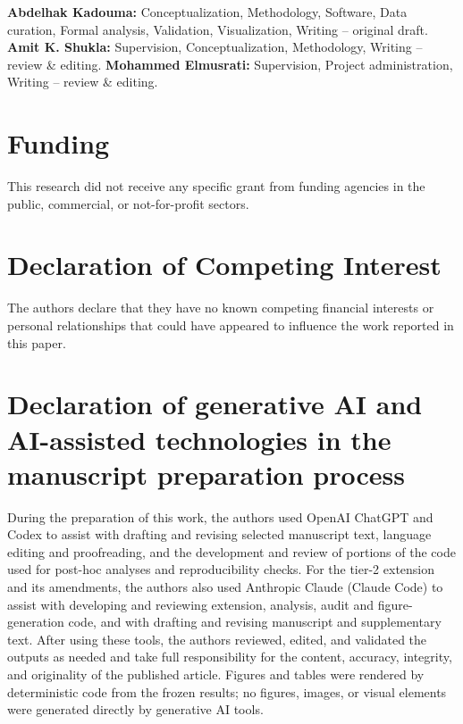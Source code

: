 \documentclass[5p,twocolumn]{elsarticle}
\begin{document}
\textbf{Abdelhak Kadouma:} Conceptualization, Methodology, Software, Data curation, Formal analysis, Validation, Visualization, Writing -- original draft. \textbf{Amit K. Shukla:} Supervision, Conceptualization, Methodology, Writing -- review \& editing. \textbf{Mohammed Elmusrati:} Supervision, Project administration, Writing -- review \& editing.


\section*{Funding}

This research did not receive any specific grant from funding agencies in
the public, commercial, or not-for-profit sectors.

\section*{Declaration of Competing Interest}

The authors declare that they have no known competing financial interests or
personal relationships that could have appeared to influence the work reported
in this paper.

\section*{Declaration of generative AI and AI-assisted technologies in the manuscript preparation process}

During the preparation of this work, the authors used OpenAI ChatGPT and Codex
to assist with drafting and revising selected manuscript text, language editing
and proofreading, and the development and review of portions of the code used
for post-hoc analyses and reproducibility checks. For the tier-2 extension and
its amendments, the authors also used Anthropic Claude (Claude Code) to assist
with developing and reviewing extension, analysis, audit and
figure-generation code, and with drafting and revising manuscript and
supplementary text. After using these tools, the
authors reviewed, edited, and validated the outputs as needed and take full
responsibility for the content, accuracy, integrity, and originality of the
published article. Figures and tables were rendered by deterministic code
from the frozen results; no figures, images, or visual elements were
generated directly by generative AI tools.




\end{document}
